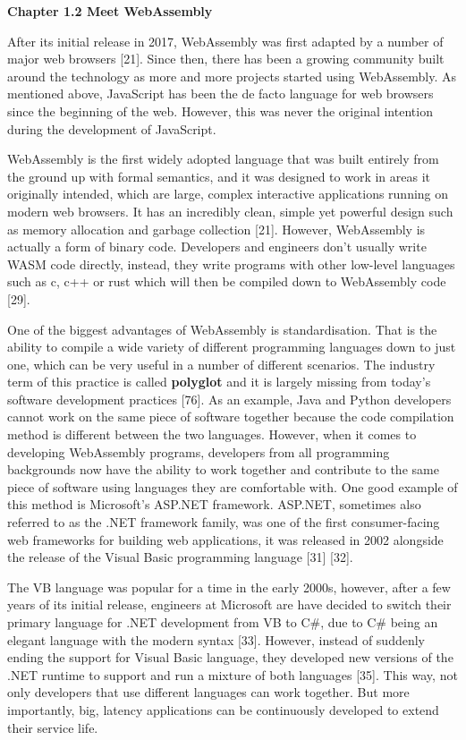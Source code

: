 \textbf{{\Large Chapter 1.2 Meet WebAssembly}}
\bigskip

After its initial release in 2017, WebAssembly was first adapted by a number of major web browsers [21]. Since then, there has been a growing community built around the technology as more and more projects started using WebAssembly. As mentioned above, JavaScript has been the de facto language for web browsers since the beginning of the web. However, this was never the original intention during the development of JavaScript.

WebAssembly is the first widely adopted language that was built entirely from the ground up with formal semantics, and it was designed to work in areas it originally intended, which are large, complex interactive applications running on modern web browsers. It has an incredibly clean, simple yet powerful design such as memory allocation and garbage collection [21]. However, WebAssembly is actually a form of binary code. Developers and engineers don't usually write WASM code directly, instead, they write programs with other low-level languages such as c, c++ or rust which will then be compiled down to WebAssembly code [29].

One of the biggest advantages of WebAssembly is standardisation. That is the ability to compile a wide variety of different programming languages down to just one, which can be very useful in a number of different scenarios. The industry term of this practice is called \textbf{polyglot} and it is largely missing from today's software development practices [76]. As an example, Java and Python developers cannot work on the same piece of software together because the code compilation method is different between the two languages. However, when it comes to developing WebAssembly programs, developers from all programming backgrounds now have the ability to work together and contribute to the same piece of software using languages they are comfortable with. One good example of this method is Microsoft's ASP.NET framework. ASP.NET, sometimes also referred to as the .NET framework family, was one of the first consumer-facing web frameworks for building web applications, it was released in 2002 alongside the release of the Visual Basic programming language [31] [32].

The VB language was popular for a time in the early 2000s, however, after a few years of its initial release, engineers at Microsoft are have decided to switch their primary language for .NET development from VB to C\#, due to C\# being an elegant language with the modern syntax [33]. However, instead of suddenly ending the support for Visual Basic language, they developed new versions of the .NET runtime to support and run a mixture of both languages [35]. This way, not only developers that use different languages can work together. But more importantly, big, latency applications can be continuously developed to extend their service life.

